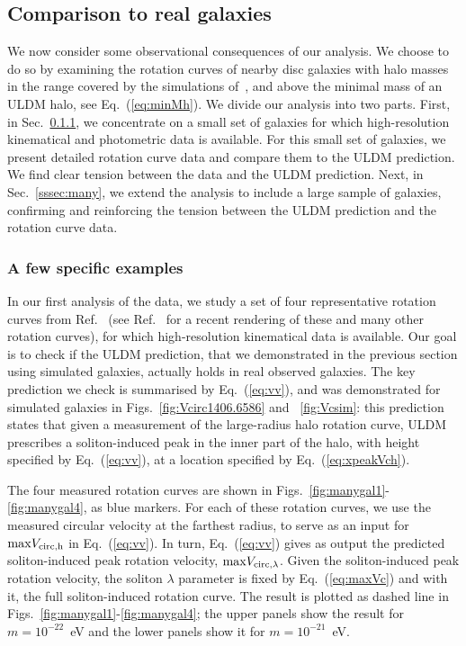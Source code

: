 \documentclass[aps,prd,floats,superscriptaddress,showpacs,nofootinbib,twocolumn,preprintnumbers]{revtex4-1}%
\begin{document}
\subsection{Comparison to real galaxies}\label{ss:compdat}
%

We now consider some observational consequences of our analysis. We
choose to do so by examining the rotation curves of nearby disc galaxies
with halo masses in the range covered by the simulations
of~\cite{Schive:2014hza,Schive:2014dra}, and above the minimal mass of
an ULDM halo, see Eq.~(\ref{eq:minMh}). We divide our analysis into two parts. First, in Sec.~\ref{sssec:few}, we concentrate on a small set of galaxies for which high-resolution kinematical and photometric data is available. For this small set of galaxies, we present detailed rotation curve data and compare them to the ULDM prediction. We find clear tension between the data and the ULDM prediction. Next, in Sec.~\ref{sssec:many}, we extend the analysis to include a large sample of galaxies, confirming and reinforcing the tension between the ULDM prediction and the rotation curve data.

\subsubsection{A few specific examples}\label{sssec:few}
%
In our first analysis of the data, we study a set of four representative rotation curves from Ref.~\cite{deBlok:2002vgq} (see Ref.~\cite{Lelli:2016zqa} for a recent
rendering of these and many other rotation curves), for which
high-resolution kinematical data is available. Our goal is to check if the ULDM prediction, that we 
demonstrated in the previous section using simulated galaxies, actually holds in real observed galaxies. The key prediction we check is summarised by Eq.~(\ref{eq:vv}), and was demonstrated for simulated galaxies in Figs.~\ref{fig:Vcirc1406.6586} and ~\ref{fig:Vcsim}: this prediction states that given a measurement of the large-radius halo rotation curve, ULDM prescribes a soliton-induced peak in the inner part of the halo, with height specified by Eq.~(\ref{eq:vv}), at a location specified by Eq.~(\ref{eq:xpeakVch}).

The four measured rotation curves are shown in Figs.~\ref{fig:manygal1}-\ref{fig:manygal4}, as blue markers. For each of these rotation curves, we use the measured circular velocity at the farthest radius, to serve as an input for ${\rm max}V_{\rm circ,h}$ in Eq.~(\ref{eq:vv}). In turn, Eq.~(\ref{eq:vv}) gives as output the predicted soliton-induced peak rotation velocity, ${\rm max}V_{\rm circ,\lambda}$. Given the soliton-induced peak rotation velocity, the soliton $\lambda$ parameter is fixed by Eq.~(\ref{eq:maxVc}) and with it, the full soliton-induced rotation curve. The result is plotted as dashed line in Figs.~\ref{fig:manygal1}-\ref{fig:manygal4}; the upper panels show the result for $m=10^{-22}$~eV and the lower panels show it for $m=10^{-21}$~eV.
\end{document}
